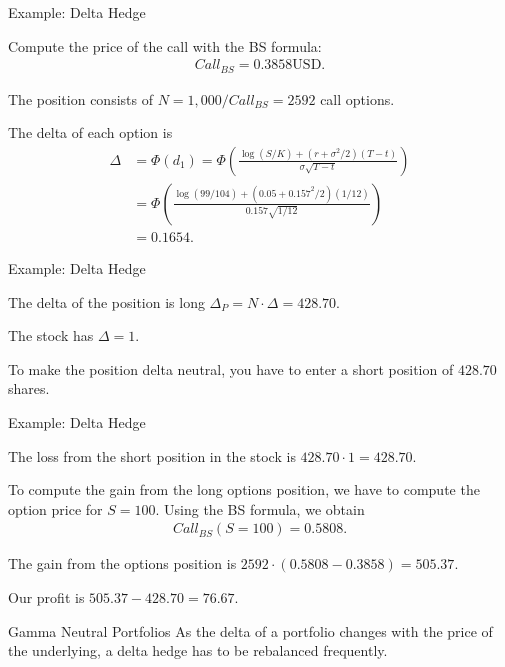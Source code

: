 
{Example: Delta Hedge}


	Compute the price of the call with the BS formula:
  \begin{align*}
    Call_{BS} = 0.3858 \text{USD}.
  \end{align*}

	The position consists of $N=1,000/Call_{BS}=2592$ call options.

	The delta of each option is
  \begin{align*}
    \Delta &= \Phi(d_1) =\Phi\left(\frac{\log \left( S/K \right) + (r+\sigma^2/2)(T-t)
    }{\sigma\sqrt{T-t}}\right) \\
    	&= \Phi\left(\frac{\log \left( 99/104 \right) + (0.05+0.157^2/2)(1/12)
    }{0.157\sqrt{1/12}}\right)\\
     	&= 0.1654.
  \end{align*}


{Example: Delta Hedge}


	The delta of the position is long $\Delta_P=N\cdot \Delta=428.70$.

	The stock has $\Delta=1$.

	To make the position delta neutral, you have to enter a short position
  of $428.70$ shares.


{Example: Delta Hedge}


	The loss from the short position in the stock is $428.70 \cdot
  1=428.70$.

	To compute the gain from the long options position, we have to compute
  the option price for $S=100$. Using the BS formula, we obtain
  \begin{align*}
    Call_{BS}(S=100) = 0.5808.
  \end{align*}

	The gain from the options position is $2592\cdot(0.5808-0.3858)=505.37$.

	Our profit is $505.37-428.70=76.67$.


{Gamma Neutral Portfolios}
As the delta of a portfolio changes with the price of the underlying, a delta
hedge has to be rebalanced frequently.

